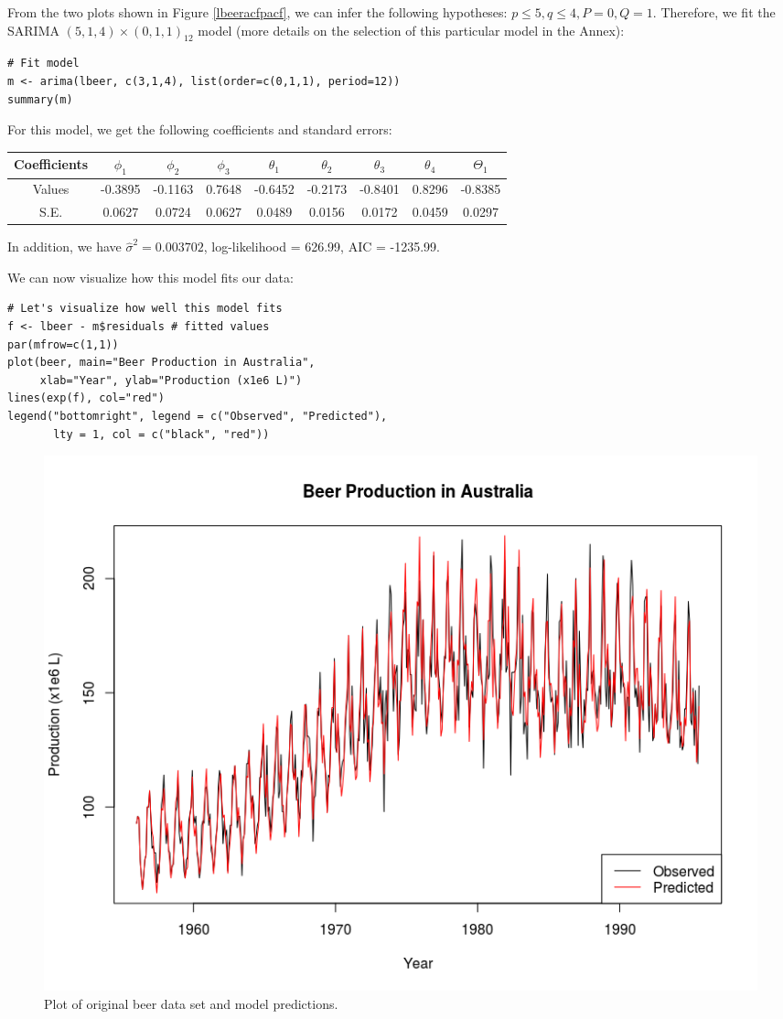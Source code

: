 \documentclass[]{article}
\begin{document}
From the two plots shown in Figure \ref{lbeeracfpacf}, we can infer the following hypotheses: $p \leq 5, q \leq 4, P = 0, Q = 1$. Therefore, we fit the SARIMA $(5,1,4)\times(0,1,1)_{12}$ model (more details on the selection of this particular model in the Annex):
\begin{Verbatim}[frame=single]
# Fit model
m <- arima(lbeer, c(3,1,4), list(order=c(0,1,1), period=12))
summary(m)
\end{Verbatim}

For this model, we get the following coefficients and standard errors:

\begin{center}
\begin{tabular}{c|c|c|c|c|c|c|c|c}
Coefficients&$\phi_1$&$\phi_2$&$\phi_3$&$\theta_1$&$\theta_2$&$\theta_3$&$\theta_4$&$\Theta_1$\\
\hline
Values&-0.3895&-0.1163&0.7648&-0.6452&-0.2173&-0.8401&0.8296&-0.8385\\
S.E.&0.0627&0.0724&0.0627&0.0489&0.0156&0.0172&0.0459&0.0297\\
\end{tabular}
\end{center}

In addition, we have $\hat{\sigma}^2 = 0.003702$, log-likelihood = 626.99, AIC = -1235.99.

We can now visualize how this model fits our data:
\begin{Verbatim}[frame=single]
# Let's visualize how well this model fits
f <- lbeer - m$residuals # fitted values
par(mfrow=c(1,1))
plot(beer, main="Beer Production in Australia",
     xlab="Year", ylab="Production (x1e6 L)")
lines(exp(f), col="red")
legend("bottomright", legend = c("Observed", "Predicted"),
       lty = 1, col = c("black", "red"))
\end{Verbatim}

\begin{figure}[!ht]
\centering
\includegraphics[width=.8\textwidth]{beerpred.png}
\caption{Plot of original beer data set and model predictions.}
\label{beerpred}
\end{figure}
\end{document}
